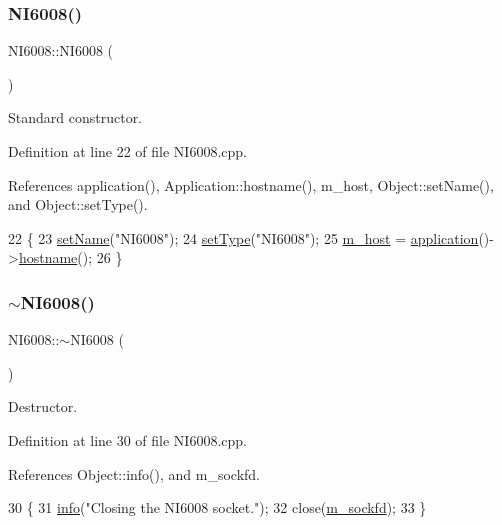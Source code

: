 \subsubsection{\texorpdfstring{N\+I6008()}{NI6008()}}
{\footnotesize\ttfamily N\+I6008\+::\+N\+I6008 (\begin{DoxyParamCaption}{ }\end{DoxyParamCaption})}



Standard constructor. 



Definition at line 22 of file N\+I6008.\+cpp.



References application(), Application\+::hostname(), m\+\_\+host, Object\+::set\+Name(), and Object\+::set\+Type().


\begin{DoxyCode}
22                  \{
23   \hyperlink{classObject_ae30fea75683c2d149b6b6d17c09ecd0c}{setName}(\textcolor{stringliteral}{"NI6008"});
24   \hyperlink{classObject_aae534cc9d982bcb9b99fd505f2e103a5}{setType}(\textcolor{stringliteral}{"NI6008"});
25   \hyperlink{classNI6008_ab8b247caa89b1dc9b9c78b0c1b08ed5d}{m\_host} = \hyperlink{Tools_8h_a27885a3c35afe79029fb830f32f66458}{application}()->\hyperlink{classApplication_a095248805e26b553466b7fafc6517d8f}{hostname}();
26 \}
\end{DoxyCode}
\mbox{\label{classNI6008_a31832f3501f4741fdf8616a44a2f4fc8}} 
\subsubsection{\texorpdfstring{$\sim$\+N\+I6008()}{~NI6008()}}
{\footnotesize\ttfamily N\+I6008\+::$\sim$\+N\+I6008 (\begin{DoxyParamCaption}{ }\end{DoxyParamCaption})\hspace{0.3cm}{\ttfamily [virtual]}}



Destructor. 



Definition at line 30 of file N\+I6008.\+cpp.



References Object\+::info(), and m\+\_\+sockfd.


\begin{DoxyCode}
30                 \{
31   \hyperlink{classObject_a644fd329ea4cb85f54fa6846484b84a8}{info}(\textcolor{stringliteral}{"Closing the NI6008 socket."});
32   close(\hyperlink{classNI6008_aa1ca2ab973aaceac58d9d17e482682b5}{m\_sockfd});
33 \}
\end{DoxyCode}


